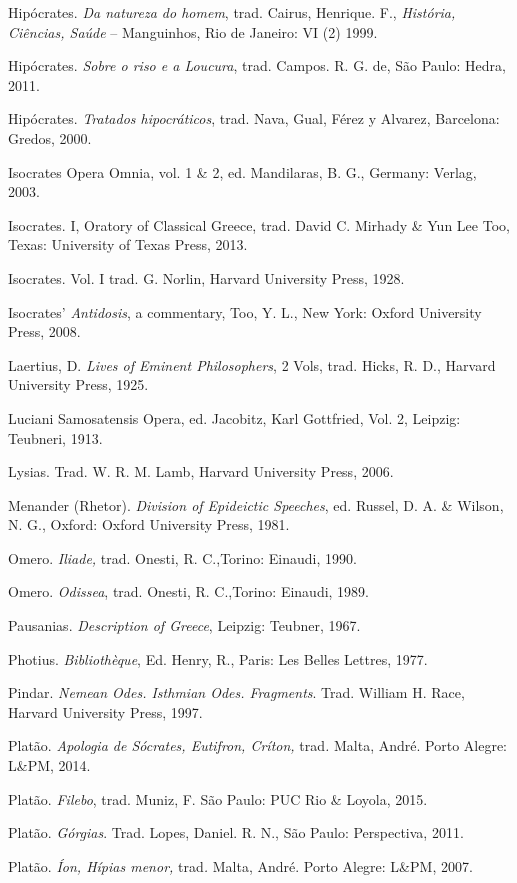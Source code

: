 Hipócrates. \emph{Da natureza do homem}, trad. Cairus, Henrique. F.,
\emph{História, Ciências, Saúde} -- Manguinhos, Rio de Janeiro: VI (2)
1999.

Hipócrates. \emph{Sobre o riso e a Loucura}, trad. Campos. R. G. de, São
Paulo: Hedra, 2011.

Hipócrates. \emph{Tratados hipocráticos}, trad. Nava, Gual, Férez y
Alvarez, Barcelona: Gredos, 2000.

Isocrates Opera Omnia, vol. 1 \& 2, ed. Mandilaras, B. G., Germany:
Verlag, 2003.

Isocrates. I, Oratory of Classical Greece, trad. David C. Mirhady \& Yun
Lee Too, Texas: University of Texas Press, 2013.

Isocrates. Vol. I trad. G. Norlin, Harvard University Press, 1928.

Isocrates' \emph{Antidosis}, a commentary, Too, Y. L., New York: Oxford
University Press, 2008.

Laertius, D. \emph{Lives of Eminent Philosophers}, 2 Vols, trad. Hicks,
R. D., Harvard University Press, 1925.

Luciani Samosatensis Opera, ed. Jacobitz, Karl Gottfried, Vol. 2,
Leipzig: Teubneri, 1913.

Lysias. Trad. W. R. M. Lamb, Harvard University Press, 2006.

Menander (Rhetor). \emph{Division of Epideictic Speeches}, ed. Russel,
D. A. \& Wilson, N. G., Oxford: Oxford University Press, 1981.

Omero. \emph{Iliade,} trad. Onesti, R. C.,Torino: Einaudi, 1990.

Omero. \emph{Odissea}, trad. Onesti, R. C.,Torino: Einaudi, 1989.

Pausanias. \emph{Description of Greece}, Leipzig: Teubner, 1967.

Photius. \emph{Bibliothèque}, Ed. Henry, R., Paris: Les Belles Lettres,
1977.

Pindar. \emph{Nemean Odes. Isthmian Odes. Fragments}. Trad. William H.
Race, Harvard University Press, 1997.

Platão. \emph{Apologia de Sócrates, Eutifron, Críton,} trad\emph{.}
Malta, André. Porto Alegre: L\&PM, 2014.

Platão. \emph{Filebo}, trad. Muniz, F. São Paulo: PUC Rio \& Loyola,
2015.

Platão. \emph{Górgias}. Trad. Lopes, Daniel. R. N., São Paulo:
Perspectiva, 2011.

Platão. \emph{Íon, Hípias menor,} trad\emph{.} Malta, André. Porto
Alegre: L\&PM, 2007.

